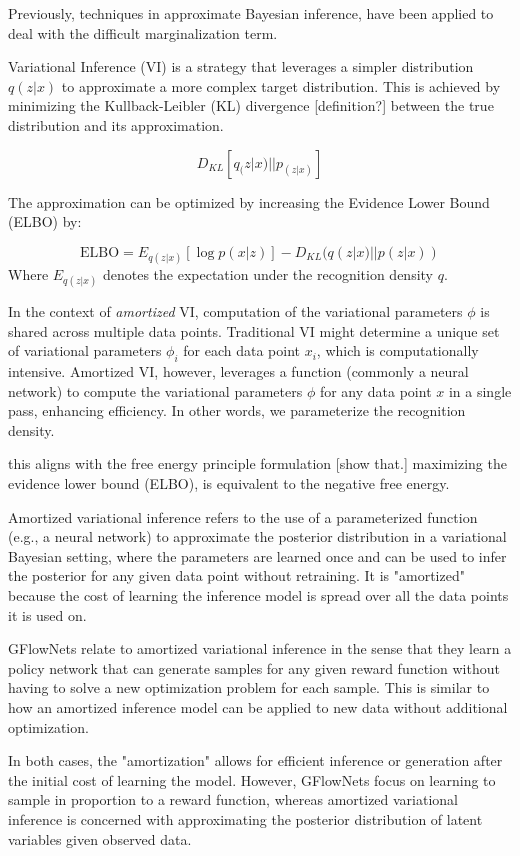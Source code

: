 Previously, techniques in approximate Bayesian inference, have been applied to deal with the difficult marginalization term.

Variational Inference (VI) is a strategy that leverages a simpler distribution \( q(z | x) \)  to approximate a more complex target distribution. This is achieved by minimizing the Kullback-Leibler (KL) divergence [definition?] between the true distribution and its approximation.

\[
    D_{KL}[q_(z|x) || p_(z|x)]
\]

The approximation can be optimized by increasing the Evidence Lower Bound (ELBO) by:

\begin{equation}
\text{ELBO} = E_{q(z|x)}[\log p(x|z)] - D_{KL}(q(z|x) || p(z|x))
\end{equation}
Where \( E_{q(z|x)} \) denotes the expectation under the recognition density \( q \).

In the context of \emph{amortized} VI, computation of the variational parameters \( \phi \) is shared across multiple data points. Traditional VI might determine a unique set of variational parameters \( \phi_i \) for each data point \( x_i \), which is computationally intensive. Amortized VI, however, leverages a function (commonly a neural network) to compute the variational parameters \( \phi \) for any data point \( x \) in a single pass, enhancing efficiency. In other words, we parameterize the recognition density. 

this aligns with the free energy principle formulation [show that.]
maximizing the evidence lower bound (ELBO), is equivalent to the negative free energy. 


Amortized variational inference refers to the use of a parameterized function (e.g., a neural network) to approximate the posterior distribution in a variational Bayesian setting, where the parameters are learned once and can be used to infer the posterior for any given data point without retraining. It is "amortized" because the cost of learning the inference model is spread over all the data points it is used on.

GFlowNets relate to amortized variational inference in the sense that they learn a policy network that can generate samples for any given reward function without having to solve a new optimization problem for each sample. This is similar to how an amortized inference model can be applied to new data without additional optimization.

In both cases, the "amortization" allows for efficient inference or generation after the initial cost of learning the model. However, GFlowNets focus on learning to sample in proportion to a reward function, whereas amortized variational inference is concerned with approximating the posterior distribution of latent variables given observed data.





